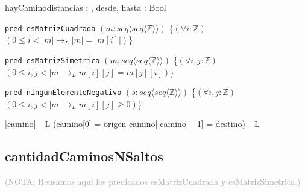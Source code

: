 \documentclass[10pt,a4paper]{article}
\begin{document}
\begin{proc}{hayCamino}{\In distancias : \TLista{\TLista{\ent}}, \In desde, hasta : \ent}{\textsf{Bool}}
\end{proc}

\texttt{pred esMatrizCuadrada} $(m : seq \langle seq \langle \mathbb{Z} \rangle \rangle)$ \{$(\forall i : \mathbb{Z})$ $(0 \leq i < |m| \longrightarrow_L |m| = |m[i]|)$\}

\texttt{pred esMatrizSimetrica} $(m : seq \langle seq \langle \mathbb{Z} \rangle \rangle)$ \{$(\forall i, j : \mathbb{Z})$ $(0 \leq i, j < |m| \longrightarrow_L m[i][j] = m[j][i])$\}
    
\texttt{pred ningunElementoNegativo} $(s : seq \langle seq \langle \mathbb{Z} \rangle \rangle)$ \{$(\forall i, j : \mathbb{Z})$ $(0 \leq i, j < |m| \longrightarrow_L m[i][j] \geq 0)$\}


{|camino|  \land_L (camino[0] = origen \land camino[|camino| - 1] = destino) \land_L \\
}



\subsection{cantidadCaminosNSaltos}

\textcolor{darkgray}{(\textsc{NOTA}: Reusamos aquí los predicados \textsf{esMatrizCuadrada} y \textsf{esMatrizSimetrica}.)}
\end{document}

